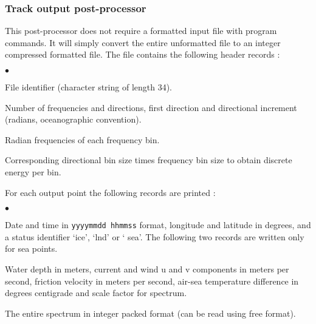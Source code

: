 \vsssub
\subsubsection{Track output post-processor} \label{sec:ww3trck}
\vsssub


\vspace{\baselineskip} 
\noindent
This post-processor does not require a formatted input file with program
commands. It will simply convert the entire unformatted file to an integer
compressed formatted file. The file contains the following header records :

\begin{list}{$\bullet$}{\itemsep 0mm \parsep 0mm}
\item File identifier (character string of length 34).
\item Number of frequencies and directions, first direction and directional
      increment (radians, oceanographic convention).
\item Radian frequencies of each frequency bin.
\item Corresponding directional bin size times frequency bin size to obtain
      discrete energy per bin.
\end{list}

\noindent
For each output point the following records are printed :
\begin{list}{$\bullet$}{\itemsep 0mm \parsep 0mm}
\item Date and time in {\tt yyyymmdd hhmmss} format, longitude and latitude in
      degrees, and a status identifier `{\F ice}', `{\F lnd}' or `{\F
      sea}'. The following two records are written only for sea points.
\item Water depth in meters, current and wind u and v components in meters per
      second, friction velocity in meters per second, air-sea temperature
      difference in degrees centigrade and scale factor for spectrum.
\item The entire spectrum in integer packed format (can be read using free
      format).
\end{list}

\pb